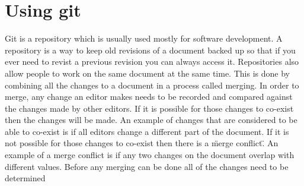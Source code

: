 \chapter{Using git}
Git is a repository which is usually used mostly for software development.
A repository is a way to keep old revisions of a document backed up so that if you ever need to revist a previous revision you can always access it.
Repositories also allow people to work on the same document at the same time.
This is done by combining all the changes to a document in a process called merging. 
In order to merge, any change an editor makes needs to be recorded and compared against the changes made by other editors.
If it is possible for those changes to co-exist then the changes will be made.
An example of changes that are considered to be able to co-exist is if all editors change a different part of the document.
If it is not possible for those changes to co-exist then there is a \"merge conflict\".
An example of a merge conflict is if any two changes on the document overlap with different values.
Before any merging can be done all of the changes need to be determined
 
 


